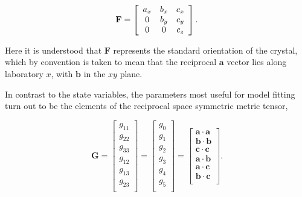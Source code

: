 \documentclass[12pt, letterpaper]{article}
\begin{document}
  \begin{equation}
    \mathbf{F} = 
    \left[
    \begin{array}{c c c}
       a_{x}  & b_{x} & c_{x} \\
       0  & b_{y} & c_{y} \\
       0  & 0 & c_{z} \\
    \end{array}
    \right]
    \text{.}
    \label{eqn:expansionF}
  \end{equation}

Here it is understood that $\mathbf{F}$ represents the standard orientation of the crystal, which by convention is taken to mean that the reciprocal $\mathbf{a}$ vector lies along laboratory $x$, with $\mathbf{b}$ in the $xy$ plane.  
  
In contrast to the state variables, the parameters most useful for model fitting turn out to be the elements of the reciprocal space symmetric metric tensor, 

  \begin{equation}
    \mathbf{G} = 
    \left[
    \begin{array}{c}
       g_{11}  \\ g_{22} \\ g_{33} \\
       g_{12}  \\ g_{13} \\ g_{23} 
       \\
    \end{array}
    \right] = 
    \left[
    \begin{array}{c}
       g_{0}  \\ g_{1} \\ g_{2} \\
       g_{3}  \\ g_{4} \\ g_{5} 
       \\
    \end{array}
    \right] = 
     \left[
    \begin{array}{c}
       \mathbf{a}\cdot\mathbf{a}  \\ \mathbf{b}\cdot\mathbf{b} \\ \mathbf{c}\cdot\mathbf{c} \\
       \mathbf{a}\cdot\mathbf{b}  \\ \mathbf{a}\cdot\mathbf{c} \\ \mathbf{b}\cdot\mathbf{c}
       \\
    \end{array}
    \right]
   \text{.}
    \label{eqn:expansionG}
  \end{equation}
\end{document}
